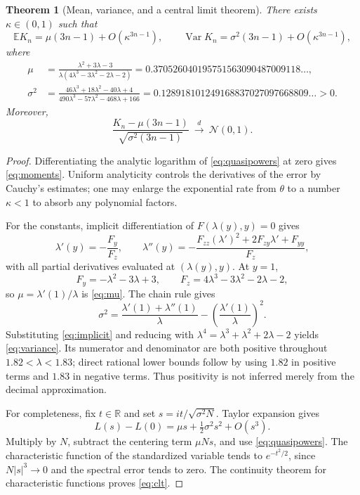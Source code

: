 \documentclass[11pt,a4paper]{article}
\newtheorem{theorem}{Theorem}[section]
\theoremstyle{definition}
\newcommand{\R}{\mathbb R}
\newcommand{\E}{\mathbb E}
\newcommand{\Var}{\operatorname{Var}}
\begin{document}
\begin{theorem}[Mean, variance, and a central limit theorem]
\label{thm:clt}
There exists $\kappa\in(0,1)$ such that
\begin{equation}
 \E K_n=\mu(3n-1)+O(\kappa^{3n-1}),\qquad
 \Var K_n=\sigma^2(3n-1)+O(\kappa^{3n-1}),
 \label{eq:moments}
\end{equation}
where
\begin{align}
 \mu&=\frac{\lambda^2+3\lambda-3}
 {\lambda(4\lambda^3-3\lambda^2-2\lambda-2)}
 =0.370526040195751563090487009118\ldots,
 \label{eq:mu}\\
 \sigma^2&=
 \frac{46\lambda^3+18\lambda^2-40\lambda+4}
 {490\lambda^3-57\lambda^2-468\lambda+166}
 =0.128918101249168837027097668809\ldots>0.
 \label{eq:variance}
\end{align}
Moreover,
\begin{equation}
 \frac{K_n-\mu(3n-1)}{\sqrt{\sigma^2(3n-1)}}
 \ \xrightarrow{\ d\ }\ \mathcal N(0,1).
 \label{eq:clt}
\end{equation}
\end{theorem}

\begin{proof}
Differentiating the analytic logarithm of \cref{eq:quasipowers} at zero
gives \cref{eq:moments}. Uniform analyticity controls the derivatives of the
error by Cauchy's estimates; one may enlarge the exponential rate from
$\theta$ to a number $\kappa<1$ to absorb any polynomial factors.

For the constants, implicit differentiation of $F(\lambda(y),y)=0$ gives
\begin{equation}
 \lambda'(y)=-\frac{F_y}{F_z},\qquad
 \lambda''(y)=-\frac{F_{zz}(\lambda')^2+2F_{zy}\lambda'+F_{yy}}{F_z},
 \label{eq:implicit}
\end{equation}
with all partial derivatives evaluated at $(\lambda(y),y)$. At $y=1$,
\[
 F_y=-\lambda^2-3\lambda+3,\qquad
 F_z=4\lambda^3-3\lambda^2-2\lambda-2,
\]
so $\mu=\lambda'(1)/\lambda$ is \cref{eq:mu}. The chain rule gives
\begin{equation}
 \sigma^2=
 \frac{\lambda'(1)+\lambda''(1)}{\lambda}
 -\left(\frac{\lambda'(1)}{\lambda}\right)^2.
 \label{eq:variancechain}
\end{equation}
Substituting \cref{eq:implicit} and reducing with
$\lambda^4=\lambda^3+\lambda^2+2\lambda-2$ yields \cref{eq:variance}.
Its numerator and denominator are both positive throughout
$1.82<\lambda<1.83$; direct rational lower bounds follow by using $1.82$
in positive terms and $1.83$ in negative terms. Thus positivity is not
inferred merely from the decimal approximation.

For completeness, fix $t\in\R$ and set
$s=it/\sqrt{\sigma^2N}$. Taylor expansion gives
\[
 L(s)-L(0)=\mu s+\tfrac12\sigma^2s^2+O(s^3).
\]
Multiply by $N$, subtract the centering term $\mu Ns$, and use
\cref{eq:quasipowers}. The characteristic function of the standardized
variable tends to $e^{-t^2/2}$, since $N|s|^3\to0$ and the spectral error
tends to zero. The continuity theorem for characteristic functions proves
\cref{eq:clt}.
\end{proof}
\end{document}
